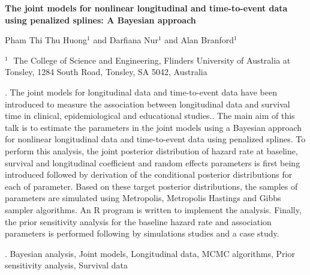 \documentclass[12pt]{article}
\begin{document}
\begin{flushleft}


{\LARGE\bf  The joint models for nonlinear longitudinal and time-to-event data using penalized splines: A Bayesian approach}


\vspace{1.0cm}

Pham Thi Thu Huong$^1$ and  Darfiana Nur$^1$ and  Alan Branford$^1$

\begin{description}

\item $^1 \;$  The College of Science and Engineering, Flinders University of Australia at Tonsley, 1284 South Road, Tonsley, SA 5042, Australia

\end{description}

\end{flushleft}


\vspace{0.65cm}

. 
The joint models for longitudinal data and time-to-event data have been introduced to measure the association between longitudinal data and survival time in
clinical, epidemiological and educational studies.. 
The main aim of this talk is to estimate the parameters in the joint models using a Bayesian approach for nonlinear longitudinal data and time-to-event data using penalized splines. To perform this analysis, the joint posterior distribution of hazard rate at baseline, survival
and longitudinal coefficient and random effects parameters is first being introduced followed by derivation of the conditional
posterior distributions for each of parameter.  Based on these target posterior distributions, the
samples of parameters are simulated using Metropolis, Metropolis Hastings and Gibbs sampler algorithms. An R program is written to implement the analysis.
Finally, the prior sensitivity analysis for the baseline hazard rate and association parameters is performed
following by simulations studies and a case study.

\vskip 2mm

.
Bayesian analysis, Joint models, Longitudinal data, MCMC algorithms, Prior sensitivity analysis, Survival data
\end{document}
